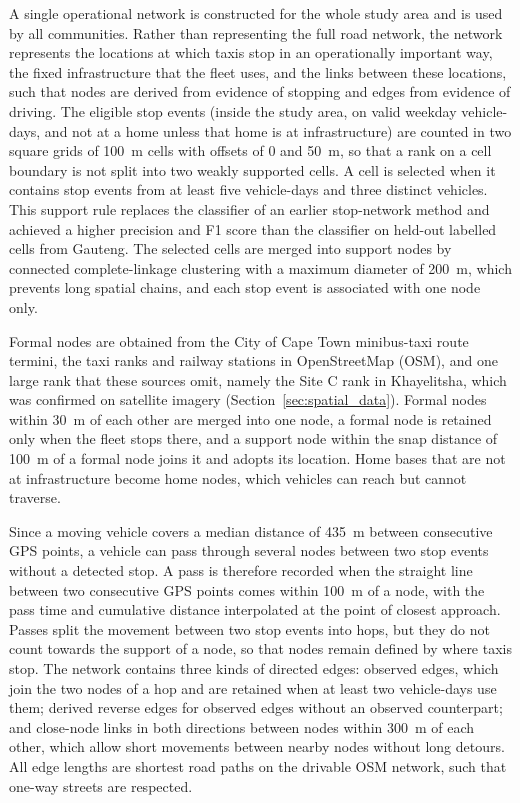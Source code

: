A single operational network is constructed for the whole study area and is used by all communities. Rather than representing the full road network, the network represents the locations at which taxis stop in an operationally important way, the fixed infrastructure that the fleet uses, and the links between these locations, such that nodes are derived from evidence of stopping and edges from evidence of driving. The eligible stop events (inside the study area, on valid weekday vehicle-days, and not at a home unless that home is at infrastructure) are counted in two square grids of 100~m cells with offsets of 0 and 50~m, so that a rank on a cell boundary is not split into two weakly supported cells. A cell is selected when it contains stop events from at least five vehicle-days and three distinct vehicles. This support rule replaces the classifier of an earlier stop-network method and achieved a higher precision and F1 score than the classifier on held-out labelled cells from Gauteng. The selected cells are merged into support nodes by connected complete-linkage clustering with a maximum diameter of 200~m, which prevents long spatial chains, and each stop event is associated with one node only.

Formal nodes are obtained from the City of Cape Town minibus-taxi route termini, the taxi ranks and railway stations in OpenStreetMap (OSM), and one large rank that these sources omit, namely the Site C rank in Khayelitsha, which was confirmed on satellite imagery (Section~\ref{sec:spatial_data}). Formal nodes within 30~m of each other are merged into one node, a formal node is retained only when the fleet stops there, and a support node within the snap distance of 100~m of a formal node joins it and adopts its location. Home bases that are not at infrastructure become home nodes, which vehicles can reach but cannot traverse.

Since a moving vehicle covers a median distance of 435~m between consecutive GPS points, a vehicle can pass through several nodes between two stop events without a detected stop. A pass is therefore recorded when the straight line between two consecutive GPS points comes within 100~m of a node, with the pass time and cumulative distance interpolated at the point of closest approach. Passes split the movement between two stop events into hops, but they do not count towards the support of a node, so that nodes remain defined by where taxis stop. The network contains three kinds of directed edges: observed edges, which join the two nodes of a hop and are retained when at least two vehicle-days use them; derived reverse edges for observed edges without an observed counterpart; and close-node links in both directions between nodes within 300~m of each other, which allow short movements between nearby nodes without long detours. All edge lengths are shortest road paths on the drivable OSM network, such that one-way streets are respected.

